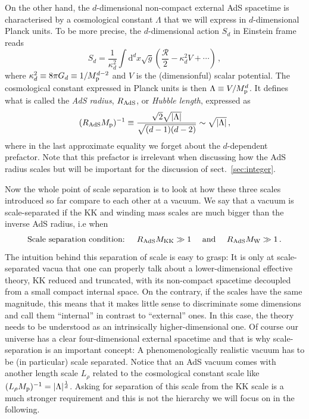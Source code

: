 \documentclass[11pt, a4paper]{article}
\newcommand{\dd}{\text{d}}
\newcommand{\MK}{M_{\rm KK}}
\newcommand{\MW}{M_{\rm W}}
\newcommand{\Mp}{M_{\rm p}}
\newcommand{\Rads}{R_{\rm AdS}}
\begin{document}
On the other hand, the $d$-dimensional non-compact external AdS spacetime is characterised by a cosmological constant $\Lambda$ that we will express in $d$-dimensional Planck units. To be more precise, the $d$-dimensional action $S_d$ in Einstein frame reads
\begin{equation}
S_d=\frac{1}{\kappa_d^2}\int\dd^{d}x\sqrt{g}\left(\frac{\mathcal{R}}{2}-\kappa_d^2 V+\cdots\right)\, ,
\end{equation}
%
where $\kappa_d^2\equiv 8\pi G_d\equiv 1/\Mp^{d-2}$ and $V$ is the (dimensionful) scalar potential. The cosmological constant expressed in Planck units is then $\Lambda\equiv V/\Mp^d$. It defines what is called the \emph{AdS radius}, $\Rads$, or \emph{Hubble length}, expressed as \cite{Palti:2019pca,Nastase:2015wjb}
\begin{equation}
\label{eq:Rads}
(\Rads\Mp)^{-1}\equiv\frac{\sqrt{2}\sqrt{|\Lambda|}}{\sqrt{(d-1)(d-2)}}\sim \sqrt{|\Lambda|}\, ,
\end{equation}
%
where in the last approximate equality we forget about the $d$-dependent prefactor. Note that this prefactor is irrelevant when discussing how the AdS radius scales but will be important for the discussion of sect.~\ref{sec:integer}.

Now the whole point of scale separation is to look at how these three scales introduced so far compare to each other at a vacuum. We say that a vacuum is scale-separated if the KK and winding mass scales are much bigger than the inverse AdS radius, i.e when
\begin{equation}
\label{eq:scale_sep}
\text{Scale separation condition: }\quad \Rads\MK\gg 1 \quad\text{ and }\quad \Rads\MW\gg 1\, .
\end{equation}
%
The intuition behind this separation of scale is easy to grasp: It is only at scale-separated vacua that one can properly talk about a lower-dimensional effective theory, KK reduced and truncated, with its non-compact spacetime decoupled from a small compact internal space. On the contrary, if the scales have the same magnitude, this means that it makes little sense to discriminate some dimensions and call them ``internal'' in contrast to ``external'' ones. In this case, the theory needs to be understood as an intrinsically higher-dimensional one. Of course our universe has a clear four-dimensional external spacetime and that is why scale-separation is an important concept: A phenomenologically realistic vacuum has to be (in particular) scale separated. Notice that an AdS vacuum comes with another length scale $L_\rho$ \cite{Cribiori:2021djm} related to the cosmological constant scale like $(L_\rho\Mp)^{-1}=|\Lambda|^{\frac{1}{d}}$. Asking for separation of this scale from the KK scale is a much stronger requirement and this is not the hierarchy we will focus on in the following. 
\end{document}
